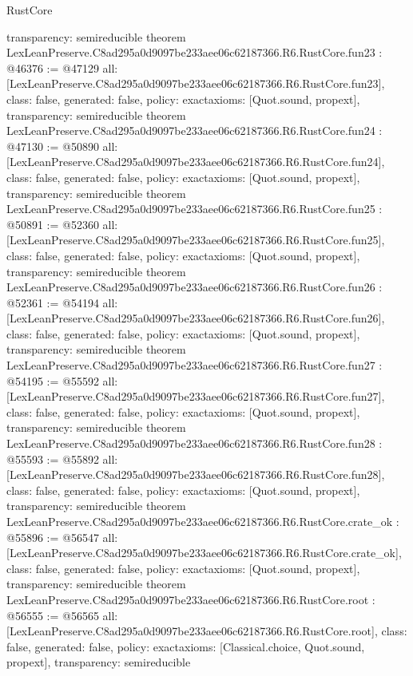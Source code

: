 \begin{lexlean}{RustCore}
\begin{coremodule}
{  transparency: semireducible
}
theorem LexLeanPreserve.C8ad295a0d9097be233aee06c62187366.R6.RustCore.fun23 : @46376 := @47129 {
  all: [LexLeanPreserve.C8ad295a0d9097be233aee06c62187366.R6.RustCore.fun23],
  class: false,
  generated: false,
  policy: exact{axioms: [Quot.sound, propext]},
  transparency: semireducible
}
theorem LexLeanPreserve.C8ad295a0d9097be233aee06c62187366.R6.RustCore.fun24 : @47130 := @50890 {
  all: [LexLeanPreserve.C8ad295a0d9097be233aee06c62187366.R6.RustCore.fun24],
  class: false,
  generated: false,
  policy: exact{axioms: [Quot.sound, propext]},
  transparency: semireducible
}
theorem LexLeanPreserve.C8ad295a0d9097be233aee06c62187366.R6.RustCore.fun25 : @50891 := @52360 {
  all: [LexLeanPreserve.C8ad295a0d9097be233aee06c62187366.R6.RustCore.fun25],
  class: false,
  generated: false,
  policy: exact{axioms: [Quot.sound, propext]},
  transparency: semireducible
}
theorem LexLeanPreserve.C8ad295a0d9097be233aee06c62187366.R6.RustCore.fun26 : @52361 := @54194 {
  all: [LexLeanPreserve.C8ad295a0d9097be233aee06c62187366.R6.RustCore.fun26],
  class: false,
  generated: false,
  policy: exact{axioms: [Quot.sound, propext]},
  transparency: semireducible
}
theorem LexLeanPreserve.C8ad295a0d9097be233aee06c62187366.R6.RustCore.fun27 : @54195 := @55592 {
  all: [LexLeanPreserve.C8ad295a0d9097be233aee06c62187366.R6.RustCore.fun27],
  class: false,
  generated: false,
  policy: exact{axioms: [Quot.sound, propext]},
  transparency: semireducible
}
theorem LexLeanPreserve.C8ad295a0d9097be233aee06c62187366.R6.RustCore.fun28 : @55593 := @55892 {
  all: [LexLeanPreserve.C8ad295a0d9097be233aee06c62187366.R6.RustCore.fun28],
  class: false,
  generated: false,
  policy: exact{axioms: [Quot.sound, propext]},
  transparency: semireducible
}
theorem LexLeanPreserve.C8ad295a0d9097be233aee06c62187366.R6.RustCore.crate_ok : @55896 := @56547 {
  all: [LexLeanPreserve.C8ad295a0d9097be233aee06c62187366.R6.RustCore.crate_ok],
  class: false,
  generated: false,
  policy: exact{axioms: [Quot.sound, propext]},
  transparency: semireducible
}
theorem LexLeanPreserve.C8ad295a0d9097be233aee06c62187366.R6.RustCore.root : @56555 := @56565 {
  all: [LexLeanPreserve.C8ad295a0d9097be233aee06c62187366.R6.RustCore.root],
  class: false,
  generated: false,
  policy: exact{axioms: [Classical.choice, Quot.sound, propext]},
  transparency: semireducible
}


\end{coremodule}
\end{lexlean}
